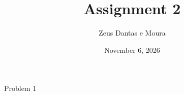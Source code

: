 \documentclass{scrreport}
\title{Assignment 2}
\author{Zeus Dantas e Moura}
\date{November 6, 2026}
\begin{document}
\maketitle

\begin{problem}{Problem 1}
\end{problem}

\begin{solution}
\end{solution}
\end{document}
